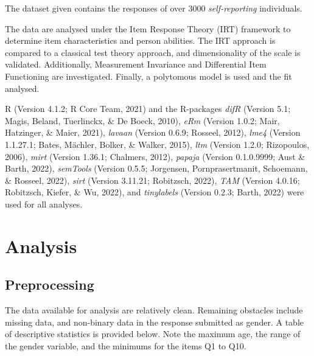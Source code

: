 \documentclass[
  man,floatsintext]{apa6}
\begin{document}
The dataset given contains the responses of over 3000 \emph{self-reporting} individuals.

The data are analysed under the Item Response Theory (IRT) framework to determine item characteristics and person abilities. The IRT approach is compared to a classical test theory approach, and dimensionality of the scale is validated. Additionally, Measurement Invariance and Differential Item Functioning are investigated. Finally, a polytomous model is used and the fit analysed.

R (Version 4.1.2; R Core Team, 2021) and the R-packages \emph{difR} (Version 5.1; Magis, Beland, Tuerlinckx, \& De Boeck, 2010), \emph{eRm} (Version 1.0.2; Mair, Hatzinger, \& Maier, 2021), \emph{lavaan} (Version 0.6.9; Rosseel, 2012), \emph{lme4} (Version 1.1.27.1; Bates, Mächler, Bolker, \& Walker, 2015), \emph{ltm} (Version 1.2.0; Rizopoulos, 2006), \emph{mirt} (Version 1.36.1; Chalmers, 2012), \emph{papaja} (Version 0.1.0.9999; Aust \& Barth, 2022), \emph{semTools} (Version 0.5.5; Jorgensen, Pornprasertmanit, Schoemann, \& Rosseel, 2022), \emph{sirt} (Version 3.11.21; Robitzsch, 2022), \emph{TAM} (Version 4.0.16; Robitzsch, Kiefer, \& Wu, 2022), and \emph{tinylabels} (Version 0.2.3; Barth, 2022) were used for all analyses.

\hypertarget{analysis}{%
\section{Analysis}\label{analysis}}

\hypertarget{preprocessing}{%
\subsection{Preprocessing}\label{preprocessing}}

The data available for analysis are relatively clean. Remaining obstacles include missing data, and non-binary data in the response submitted as gender. A table of descriptive statistics is provided below. Note the maximum age, the range of the gender variable, and the minimums for the items Q1 to Q10.
\end{document}
